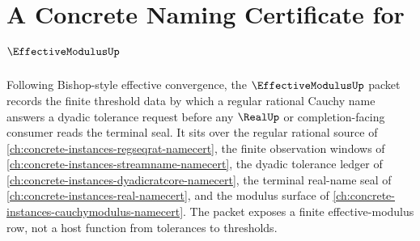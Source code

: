 \chapter{A Concrete Naming Certificate for $\EffectiveModulusUp$}
\label{ch:concrete-instances-effective-modulus-namecert}

Following Bishop-style effective convergence, the $\EffectiveModulusUp$ packet records the finite threshold data by which a regular rational Cauchy name answers a dyadic tolerance request before any $\RealUp$ or completion-facing consumer reads the terminal seal. It sits over the regular rational source of \autoref{ch:concrete-instances-regseqrat-namecert}, the finite observation windows of \autoref{ch:concrete-instances-streamname-namecert}, the dyadic tolerance ledger of \autoref{ch:concrete-instances-dyadicratcore-namecert}, the terminal real-name seal of \autoref{ch:concrete-instances-real-namecert}, and the modulus surface of \autoref{ch:concrete-instances-cauchymodulus-namecert}. The packet exposes a finite effective-modulus row, not a host function from tolerances to thresholds.

